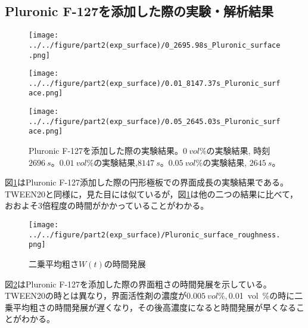 \documentclass[autodetect-engine,dvi=dvipdfmx,a4paper,ja=standard,oneside,openany,11pt]{bxjsbook}
\begin{document}
\subsection{Pluronic F-127を添加した際の実験・解析結果}
\begin{figure}[htbp]
  \begin{minipage}
    {0.32\textwidth}
    \subcaption{}
    \centering
    \texttt{[image: ../../figure/part2(exp\_surface)/0\_2695.98s\_Pluronic\_surface.png]}
    \label{fig:0_2695.98 s_Pluronic_surface}
  \end{minipage}
  \begin{minipage}
    {0.32\textwidth}
    \subcaption{}
    \centering
    \texttt{[image: ../../figure/part2(exp\_surface)/0.01\_8147.37s\_Pluronic\_surface.png]}
    \label{fig:0.01_8147.37 s_Pluronic_surface}
  \end{minipage}
  \begin{minipage}
    {0.32\textwidth}
    \subcaption{}
    \centering
    \texttt{[image: ../../figure/part2(exp\_surface)/0.05\_2645.03s\_Pluronic\_surface.png]}
    \label{fig:0.05_2645.03 s_Pluronic_surface}
  \end{minipage}
  \caption{Pluronic F-127を添加した際の実験結果。$\SI{0}{vol\%}$の実験結果, 時刻$\SI{2696}{s}$。$\SI{0.01}{vol\%}$の実験結果,$\SI{8147}{s}$。$\SI{0.05}{vol\%}$の実験結果, $\SI{2645}{s}$。}
  \label{fig:Pluronic_surface}
\end{figure}
図\ref{fig:Pluronic_surface}はPluronic F-127添加した際の円形極板での界面成長の実験結果である。TWEEN20と同様に，見た目には似ているが，図\ref{fig:Pluronic_surface}は他の二つの結果に比べて，おおよそ3倍程度の時間がかかっていることがわかる。

\begin{figure}[htbp]
  \centering
  \texttt{[image: ../../figure/part2(exp\_surface)/Pluronic\_surface\_roughness.png]}
  \caption{二乗平均粗さ$W(t)$の時間発展}
  \label{fig:surface_roughness_Pluronic}
\end{figure}

図\ref{fig:surface_roughness_Pluronic}はPluronic F-127を添加した際の界面粗さの時間発展を示している。TWEEN20の時とは異なり，界面活性剤の濃度が$\SI{0.005}{vol\%},$\SI{0.01}{vol\%}の時に二乗平均粗さの時間発展が遅くなり，その後高濃度になると時間発展が早くなることがわかる。

\ifdraft{
  
  
}{}
\end{document}
